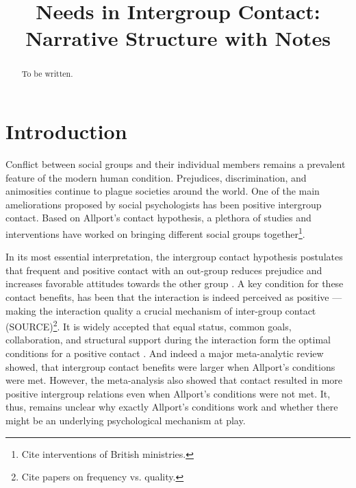 \documentclass[nobib]{tufte-handout}
\title[Needs in Intergroup Contact - Narrative]{Needs in Intergroup Contact: \\
Narrative Structure with Notes}
\author[Kreienkamp et al.]{}
\date{}  %
\theoremstyle{break}
\theoremstyle{plain}
\begin{document}
\maketitle %

\begin{abstract}
\noindent{} To be written.
\end{abstract}


\section{Introduction}
 Conflict between social groups and their individual members remains a prevalent feature of the modern human condition. Prejudices, discrimination, and animosities continue to plague societies around the world. One of the main ameliorations proposed by social psychologists has been positive intergroup contact. Based on Allport's \citeyear{Allport1954b} contact hypothesis, a plethora of studies and interventions have worked on bringing different social groups together\footnote{Cite interventions of British ministries.}. 

In its most essential interpretation, the intergroup contact hypothesis postulates that frequent and positive contact with an out-group reduces prejudice and increases favorable attitudes towards the other group \citep[e.g.,][]{Hewstone1996, Pettigrew1998}. A key condition for these contact benefits, has been that the interaction is indeed perceived as positive --- making the interaction quality a crucial mechanism of inter-group contact (SOURCE)\footnote{Cite papers on frequency vs. quality.}. It is widely accepted that equal status, common goals, collaboration, and structural support during the interaction form the optimal conditions for a positive contact \citep[Allport's Optimal Contact conditions,][]{Allport1954b}. And indeed a major meta-analytic review showed, that intergroup contact benefits were larger when Allport's conditions were met. However, the meta-analysis also showed that contact resulted in more positive intergroup relations even when Allport's conditions were not met. It, thus, remains unclear why exactly Allport's conditions work and whether there might be an underlying psychological mechanism at play.
\end{document}
